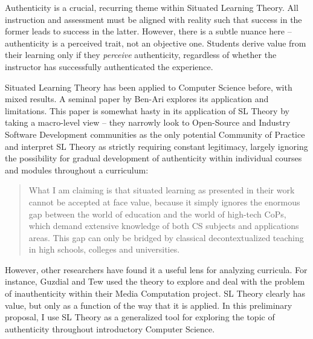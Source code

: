 Authenticity is a crucial, recurring theme within Situated Learning Theory.
All instruction and assessment must be aligned with reality such that success in the former leads to success in the latter.
However, there is a subtle nuance here -- authenticity is a perceived trait, not an objective one.
Students derive value from their learning only if they \textit{perceive} authenticity, regardless of whether the instructor has successfully authenticated the experience.

Situated Learning Theory has been applied to Computer Science before, with mixed results. A seminal paper by Ben-Ari \cite{ben2004situated} explores its application and limitations.
This paper is somewhat hasty in its application of SL Theory by taking a macro-level view -- they narrowly look to Open-Source and Industry Software Development communities as the only potential Community of Practice and interpret SL Theory as strictly requiring constant legitimacy, largely ignoring the possibility for gradual development of authenticity within individual courses and modules throughout a curriculum:

\begin{quote}
What I am claiming is that situated learning as presented in their work cannot be accepted at face value, because it simply ignores the enormous gap between the world of education and the world of high-tech CoPs, which demand extensive knowledge of both CS subjects and applications areas.
This gap can only be bridged by classical decontextualized teaching in high schools, colleges and universities.
\end{quote}

However, other researchers have found it a useful lens for analyzing curricula.
For instance, Guzdial and Tew \cite{guzdial2006imagineering} used the theory to explore and deal with the problem of inauthenticity within their Media Computation project.
SL Theory clearly has value, but only as a function of the way that it is applied.
In this preliminary proposal, I use SL Theory as a generalized tool for exploring the topic of authenticity throughout introductory Computer Science.

